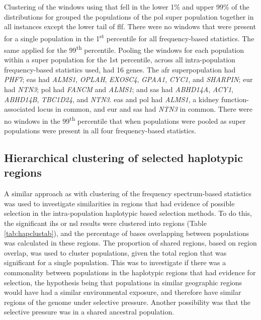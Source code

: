 \documentclass[]{report}
\begin{document}
Clustering of the windows using that fell in the lower 1\% and upper
99\% of the distributions for grouped the populations of the \gls{pol}
super population together in all instances except the lower tail of
\gls{flf}. There were no windows that were present for a single
population in the 1\textsuperscript{st} percentile for all
frequency-based statistics. The same applied for the
99\textsuperscript{th} percentile. Pooling the windows for each
population within a super population for the 1st percentile, across all
intra-population frequency-based statistics used, had 16 genes. The
\gls{afr} superpopulation had \emph{PHF7}; \gls{eas} had \emph{ALMS1},
\emph{OPLAH}, \emph{EXOSC4}, \emph{GPAA1}, \emph{CYC1}, and
\emph{SHARPIN}; \gls{eur} had \emph{NTN3}; \gls{pol} had \emph{FANCM}
and \emph{ALMS1}; and \gls{sas} had \emph{ABHD14A}, \emph{ACY1},
\emph{ABHD14B}, \emph{TBC1D24}, and \emph{NTN3}. \gls{eas} and \gls{pol}
had \emph{ALMS1}, a kidney function-associated locus
\citep{pattaro2016genetic} in common, and \gls{eur} and \gls{sas} had
\emph{NTN3} in common. There were no windows in the
99\textsuperscript{th} percentile that when populations were pooled as
super populations were present in all four frequency-based statistics.

\FloatBarrier

\subsection{Hierarchical clustering of selected haplotypic
regions}\label{hierarchical-clustering-of-selected-haplotypic-regions}

A similar approach as with clustering of the frequency spectrum-based
statistics was used to investigate similarities in regions that had
evidence of possible selection in the intra-population haplotypic based
selection methods. To do this, the significant \gls{ihs} or \gls{nsl}
results were clustered into regions (Table \ref{tab:hapclustab}), and
the percentage of bases overlapping between populations was calculated
in these regions. The proportion of shared regions, based on region
overlap, was used to cluster populations, given the total region that
was significant for a single population. This was to investigate if
there was a commonality between populations in the haplotypic regions
that had evidence for selection, the hypothesis being that populations
in similar geographic regions would have had a similar environmental
exposure, and therefore have similar regions of the genome under
selective pressure. Another possibility was that the selective pressure
was in a shared ancestral population.
\end{document}
